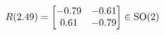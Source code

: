 \documentclass[preview]{standalone}
\begin{document}
\begin{align*}
\special{dvisvgm:raw <g id='unique000'>}R(2.49) = \begin{bmatrix} -0.79 & -0.61 \\ 0.61 & -0.79 \end{bmatrix} \in \text{SO}(2)\special{dvisvgm:raw </g>}
\end{align*}
\end{document}
